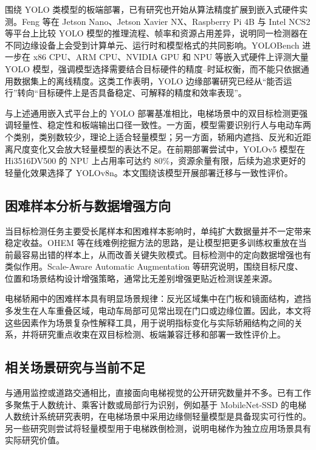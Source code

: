 围绕 YOLO 类模型的板端部署，已有研究也开始从算法精度扩展到嵌入式硬件实测。Feng 等在 Jetson Nano、Jetson Xavier NX、Raspberry Pi 4B 与 Intel NCS2 等平台上比较 YOLO 模型的推理流程、帧率和资源占用差异，说明同一检测器在不同边缘设备上会受到计算单元、运行时和模型格式的共同影响\cite{feng2022yolobenchmark}。YOLOBench 进一步在 x86 CPU、ARM CPU、NVIDIA GPU 和 NPU 等嵌入式硬件上评测大量 YOLO 模型，强调模型选择需要结合目标硬件的精度--时延权衡，而不能只依据通用数据集上的离线精度\cite{lazarevich2023yolobench}。这类工作表明，YOLO 边缘部署研究已经从“能否运行”转向“目标硬件上是否具备稳定、可解释的精度和效率表现”。

与上述通用嵌入式平台上的 YOLO 部署基准相比，电梯场景中的双目标检测更强调轻量性、稳定性和板端输出口径一致性。一方面，模型需要识别行人与电动车两个类别，类别数较少，理论上适合轻量模型；另一方面，轿厢内遮挡、反光和近距离尺度变化又会放大轻量模型的表达不足。在前期部署尝试中，YOLOv5 模型在 Hi3516DV500 的 NPU 上占用率可达约 80\%，资源余量有限，后续为追求更好的轻量化效果选择了 YOLOv8n。本文围绕该模型开展部署迁移与一致性评价。

\subsection{困难样本分析与数据增强方向}

当目标检测任务主要受长尾样本和困难样本影响时，单纯扩大数据量并不一定带来稳定收益。OHEM 等在线难例挖掘方法的思路，是让模型把更多训练权重放在当前最容易出错的样本上，从而改善关键失败模式\cite{shrivastava2016ohem}。目标检测中的定向数据增强也有类似作用。Scale-Aware Automatic Augmentation 等研究说明，围绕目标尺度、位置和场景结构设计增强策略，通常比无差别增强更贴近检测误差来源\cite{chen2021scaleaware}。

电梯轿厢中的困难样本具有明显场景规律：反光区域集中在门板和镜面结构，遮挡多发生在人车重叠区域，电动车局部可见常出现在门口或边缘位置。因此，本文将这些因素作为场景复杂性解释工具，用于说明指标变化与实际轿厢结构之间的关系，并将研究重点收束在双目标检测、板端兼容迁移和部署一致性评价上。

\subsection{相关场景研究与当前不足}

与通用监控或道路交通相比，直接面向电梯视觉的公开研究数量并不多。已有工作多聚焦于人数统计、乘客计数或局部行为识别，例如基于 MobileNet-SSD 的电梯人数统计系统研究表明，在电梯场景中采用边缘侧轻量模型是具备现实可行性的\cite{lin2023elevatorcounting}。另一些研究则尝试将轻量模型用于电梯跌倒检测，说明电梯作为独立应用场景具有实际研究价值。

